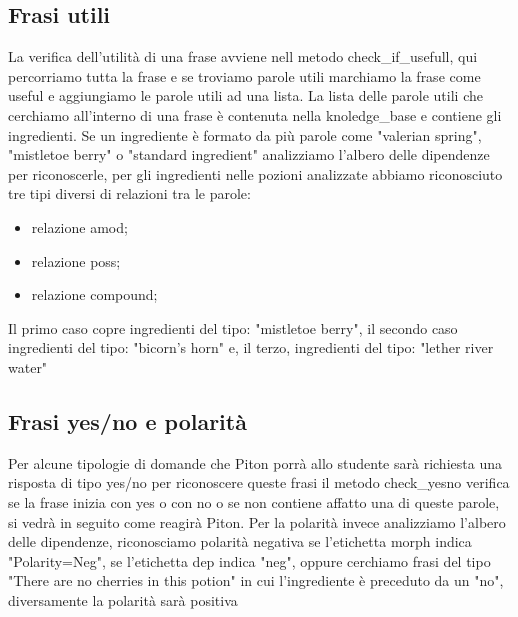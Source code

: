 \subsection{Frasi utili}
La verifica dell'utilità di una frase avviene nell metodo check\_if\_usefull, qui percorriamo tutta la frase e se troviamo parole utili  marchiamo la frase come useful e aggiungiamo le parole utili ad una lista. La lista delle parole utili che cerchiamo all'interno di una frase è contenuta nella knoledge\_base e contiene gli ingredienti. Se un ingrediente è formato da più parole come "valerian spring", "mistletoe berry" o  "standard ingredient" analizziamo l'albero delle dipendenze per riconoscerle, per gli ingredienti nelle pozioni analizzate abbiamo riconosciuto tre tipi diversi di relazioni tra le parole:
\begin{itemize}
    \item relazione amod;
    \item relazione poss;
    \item relazione compound;
\end{itemize}
Il primo caso copre ingredienti del tipo: "mistletoe berry",
il secondo caso ingredienti del tipo: "bicorn's horn" e, il terzo, ingredienti del tipo: "lether river water"
\subsection{Frasi yes/no e polarità}
Per alcune tipologie di domande che Piton porrà allo studente sarà richiesta una risposta di tipo yes/no per riconoscere queste frasi il metodo check\_yesno verifica se la frase inizia con yes o con no o se non contiene affatto una di queste parole, si vedrà in seguito come reagirà Piton.
Per la polarità invece analizziamo l'albero delle dipendenze, riconosciamo polarità negativa se l'etichetta morph indica "Polarity=Neg", se l'etichetta dep indica "neg", oppure cerchiamo frasi del tipo "There are no cherries in this potion" in cui l'ingrediente è preceduto da un "no", diversamente la polarità sarà positiva

